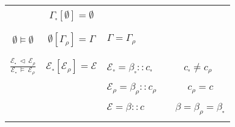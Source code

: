 \documentclass{entcs}
\renewcommand{\~}[0]{\texttildelow}
\begin{document}
\begin{defn}
\begin{center}
{\begin{tabular}{ c | | c | l }
    & & \\[0.02cm]
    \hline
    & & \\[0.02cm]

	 & 
    $ \Gamma_{\square}[\emptyset] = \emptyset $ & \\

    & & \\[0.02cm]
    \hline
    & & \\[0.02cm]

	$\emptyset \models \emptyset $ & 
    $ \emptyset[\Gamma_\rho] = \Gamma $ & 
    $\Gamma = \Gamma_\rho $ \\

    & & \\[0.02cm]
    \hline
    & & \\[0.02cm]

	$ \frac{\mathcal{E}_{\square}~\lhd~\mathcal{E}_\rho}{\mathcal{E}_{\square}~\models~\mathcal{E}_\rho} $ & 
    $ \mathcal{E}_{\square}[\mathcal{E}_\rho] = \mathcal{E} $ & 
    $ \mathcal{E}_{\square} = \beta_{\square}::c_{\square} $ ~~~~~ $ c_{\square} \neq c_\rho $ \\

    &  & $ \mathcal{E}_\rho = \beta_\rho::c_\rho $ ~~~~~ $ c_\rho = c $\\

    &  & $ \mathcal{E} = \beta::c $ ~~~~~ $ \beta = \beta_\rho = \beta_{\square} $\\

    & & \\[0.02cm]
    \hline
    \end{tabular}}
    \end{center}

\end{defn}






\end{document}
